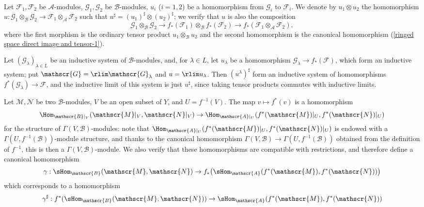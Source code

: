 Let $\mathscr{F}_1,\mathscr{F}_2$ be $\mathscr{A}$-modules, $\mathscr{G}_1,\mathscr{G}_2$ be $\mathscr{B}$-modules, $u_i$ ($i=1,2$) be a homomorphism from $\mathscr{G}_i$ to $\mathscr{F}_i$. We denote by $u_1\otimes u_2$ the homomorphism $u:\mathscr{G}_1\otimes_{\mathscr{B}}\mathscr{G}_2\to\mathscr{F}_1\otimes_{\mathscr{A}}\mathscr{F}_2$ such that $u^{\sharp}=(u_1)^{\sharp}\otimes(u_2)^{\sharp}$; we verify that $u$ is also the composition
\[\mathscr{G}_1\otimes_{\mathscr{B}}\mathscr{G}_2\to f_*(\mathscr{F}_1)\otimes_{\mathscr{B}}f_*(\mathscr{F}_2)\to f_*(\mathscr{F}_1\otimes_{\mathscr{A}}\mathscr{F}_2),\]
where the first morphism is the ordinary tensor product $u_1\otimes_{\mathscr{B}}u_2$ and the second homomorphism is the canonical homomorphism (\ref{ringed space direct image and tensor-1}).\par
Let $(\mathscr{G}_\lambda)_{\lambda\in L}$ be an inductive system of $\mathscr{B}$-modules, and, for $\lambda\in L$, let $u_\lambda$ be a homomorphism $\mathscr{G}_\lambda\to f_*(\mathscr{F})$, which form an inductive system; put $\mathscr{G}=\rlim\mathscr{G}_\lambda$ and $u=\rlim u_\lambda$. Then $(u^\lambda)^{\sharp}$ form an inductive system of homomorphisms $f^*(\mathscr{G}_\lambda)\to\mathscr{F}$, and the inductive limit of this system is just $u^{\sharp}$, since taking tensor products commutes with inductive limits.\par
Let $\mathscr{M},\mathscr{N}$ be two $\mathscr{B}$-modules, $V$ be an open subset of $Y$, and $U=f^{-1}(V)$. The map $v\mapsto f^*(v)$ is a homomorphism
\[\Hom_{\mathscr{B}|_V}(\mathscr{M}|_V,\mathscr{N}|_V)\to\Hom_{\mathscr{A}|_U}(f^*(\mathscr{M})|_U,f^*(\mathscr{N})|_U)\]
for the structure of $\Gamma(V,\mathscr{B})$-modules: note that $\Hom_{\mathscr{A}|_U}(f^*(\mathscr{M})|_U,f^*(\mathscr{N})|_U)$ is endowed with a $\Gamma(U,f^{-1}(\mathscr{B}))$-module structure, and thanks to the canonical homomorphism $\Gamma(V,\mathscr{B})\to\Gamma(U,f^{-1}(\mathscr{B}))$ obtained from the definition of $f^{-1}$, this is then a $\Gamma(V,\mathscr{B})$-module. We also verify that these homomorphisms are compatible with restrictions, and therefore define a canonical homomorphism
\[\gamma:\sHom_{\mathscr{B}}(\mathscr{M},\mathscr{N})\to f_*\big(\sHom_{\mathscr{A}}(f^*(\mathscr{M}),f^*(\mathscr{N}))\big)\]
which corresponds to a homomorphism
\begin{align}\label{ringed space inverse image and sheaf Hom}
\gamma^{\sharp}:f^*(\sHom_{\mathscr{B}}(\mathscr{M},\mathscr{N}))\to\sHom_{\mathscr{A}}(f^*(\mathscr{M}),f^*(\mathscr{N}))
\end{align}
